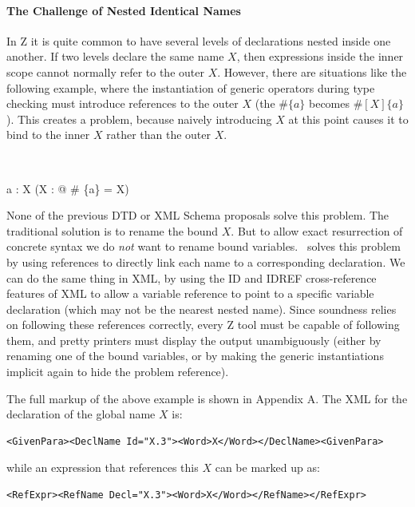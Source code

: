 \documentclass{llncs}  %
\begin{document}
\paragraph{The Challenge of Nested Identical Names}

In Z it is quite common to have several levels of declarations nested 
inside one another.  If two levels declare the same name $X$, then
expressions inside the inner scope cannot normally refer to the outer $X$.
However, there are situations like the following example, where the
instantiation of generic operators during type checking must
introduce references to the outer $X$ (the $\# \{a\}$ becomes
$\#[X]\{a\}$). This creates a problem, because naively introducing
$X$ at this point causes it to bind to the inner $X$ rather than 
the outer $X$. 
\begin{zed}
    [X] \\
\end{zed}
\begin{axdef}
    a : X
\where
    (\exists X : \nat @ \# \{a\} = X)
\end{axdef}


None of the previous DTD or XML Schema proposals solve this problem.
The traditional solution is to rename the bound $X$.  But
to allow exact resurrection of concrete syntax we do \emph{not} want to
rename bound variables.  \CADiZ\ solves this problem by using references
to directly link each name to a corresponding declaration.
We can do the same thing in XML, by using the ID and IDREF
cross-reference features of XML to allow a variable reference to point to
a specific variable declaration (which may not be the nearest nested
name).  Since soundness relies on following these references correctly,
every Z tool must be capable of following them, and pretty printers must
display the output unambiguously (either by renaming one of the bound
variables, or by making the generic instantiations implicit again to hide
the problem reference).  

The full markup of the above example is shown in Appendix A.
The XML for the declaration of the global name $X$ is:
\begin{small}
\begin{verbatim}
<GivenPara><DeclName Id="X.3"><Word>X</Word></DeclName><GivenPara>
\end{verbatim}
\end{small}
while an expression that references this $X$ can be marked up as:
\begin{small}
\begin{verbatim}
<RefExpr><RefName Decl="X.3"><Word>X</Word></RefName></RefExpr>
\end{verbatim}
\end{small}
\end{document}
